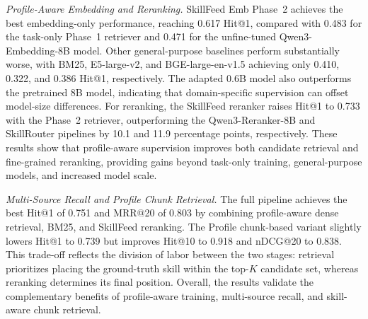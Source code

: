 \documentclass[letterpaper]{article} %
\begin{document}
\textit{Profile-Aware Embedding and Reranking.}
SkillFeed Emb Phase~2 achieves the best embedding-only performance, reaching 0.617 Hit@1, compared with 0.483 for the task-only Phase~1 retriever and 0.471 for the unfine-tuned Qwen3-Embedding-8B model. Other general-purpose baselines perform substantially worse, with BM25, E5-large-v2, and BGE-large-en-v1.5 achieving only 0.410, 0.322, and 0.386 Hit@1, respectively. The adapted 0.6B model also outperforms the pretrained 8B model, indicating that domain-specific supervision can offset model-size differences. For reranking, the SkillFeed reranker raises Hit@1 to 0.733 with the Phase~2 retriever, outperforming the Qwen3-Reranker-8B and SkillRouter pipelines by 10.1 and 11.9 percentage points, respectively. These results show that profile-aware supervision improves both candidate retrieval and fine-grained reranking, providing gains beyond task-only training, general-purpose models, and increased model scale.

\textit{Multi-Source Recall and Profile Chunk Retrieval.}
The full pipeline achieves the best Hit@1 of 0.751 and MRR@20 of 0.803 by combining profile-aware dense retrieval, BM25, and SkillFeed reranking. The Profile  chunk-based variant slightly lowers Hit@1 to 0.739 but improves Hit@10 to 0.918 and nDCG@20 to 0.838. This trade-off reflects the division of labor between the two stages: retrieval prioritizes placing the ground-truth skill within the top-$K$ candidate set, whereas reranking determines its final position. Overall, the results validate the complementary benefits of profile-aware training, multi-source recall, and skill-aware chunk retrieval.






\end{document}
